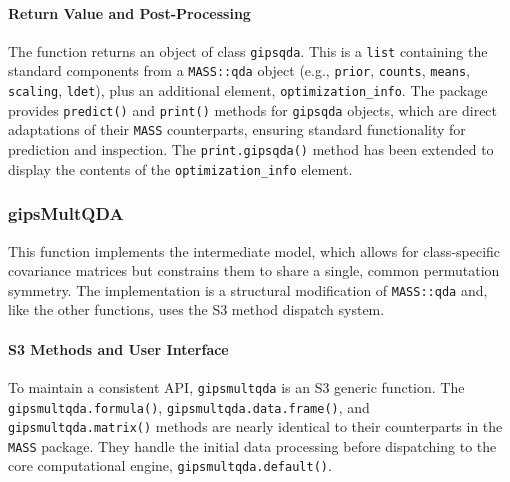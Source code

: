 \documentclass[a4paper,11pt,twoside]{report}
\theoremstyle{definition}
\begin{document}
\paragraph{Return Value and Post-Processing}
The function returns an object of class \texttt{gipsqda}. This is a \texttt{list} containing the standard components from a \texttt{MASS::qda} object (e.g., \texttt{prior}, \texttt{counts}, \texttt{means}, \texttt{scaling}, \texttt{ldet}), plus an additional element, \texttt{optimization\_info}. The package provides \texttt{predict()} and \texttt{print()} methods for \texttt{gipsqda} objects, which are direct adaptations of their \texttt{MASS} counterparts, ensuring standard functionality for prediction and inspection. The \texttt{print.gipsqda()} method has been extended to display the contents of the \texttt{optimization\_info} element.

\subsubsection{gipsMultQDA}
This function implements the intermediate model, which allows for class-specific covariance matrices but constrains them to share a single, common permutation symmetry. The implementation is a structural modification of \texttt{MASS::qda} and, like the other functions, uses the S3 method dispatch system.

\paragraph{S3 Methods and User Interface}
To maintain a consistent API, \texttt{gipsmultqda} is an S3 generic function. The \texttt{gipsmultqda.formula()}, \texttt{gipsmultqda.data.frame()}, and \texttt{gipsmultqda.matrix()} methods are nearly identical to their counterparts in the \texttt{MASS} package. They handle the initial data processing before dispatching to the core computational engine, \texttt{gipsmultqda.default()}.
\end{document}
